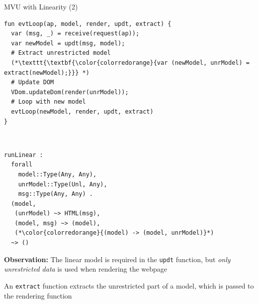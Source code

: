 \documentclass[11.5pt, aspectratio=169]{beamer}
\begin{document}
\begin{frame}[fragile]{MVU with Linearity (2)}

\begin{minipage}{0.55\textwidth}
  \begin{lstlisting}[language=links]
fun evtLoop(ap, model, render, updt, extract) {
  var (msg, _) = receive(request(ap));
  var newModel = updt(msg, model);
  # Extract unrestricted model
  (*\texttt{\textbf{\color{colorredorange}{var (newModel, unrModel) = extract(newModel);}}} *)
  # Update DOM
  VDom.updateDom(render(unrModel));
  # Loop with new model
  evtLoop(newModel, render, updt, extract)
}
  \end{lstlisting}
\end{minipage}
~
\begin{minipage}{0.42\textwidth}
\begin{lstlisting}[numbers=none, backgroundcolor=\color{white}]
runLinear :
  forall
    model::Type(Any, Any),
    unrModel::Type(Unl, Any),
    msg::Type(Any, Any) .
  (model,
   (unrModel) ~> HTML(msg),
   (model, msg) ~> (model),
   (*\color{colorredorange}{(model) -> (model, unrModel)}*)
  ~> ()
\end{lstlisting}
\end{minipage}

  \begin{fullpageitemize}
  \item \textbf{Observation:} The linear model is required in the \texttt{updt} function, but \emph{only unrestricted data} is used when rendering the webpage
    \begin{itemize}
      \itemR An \texttt{extract} function extracts the unrestricted part of a model, which is passed to the rendering function
    \end{itemize}
  \end{fullpageitemize}
\end{frame}

\end{document}
